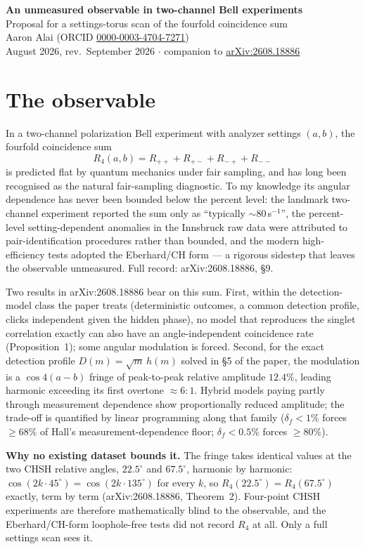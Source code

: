 \documentclass[11pt]{article}
\begin{document}
\begin{center}
{\Large\bfseries An unmeasured observable in two-channel Bell experiments}\\[3pt]
{\large Proposal for a settings-torus scan of the fourfold coincidence sum}\\[5pt]
Aaron Alai (ORCID \href{https://orcid.org/0000-0003-4704-7271}{0000-0003-4704-7271})\\
August 2026, rev.\ September 2026 $\cdot$ companion to \href{https://arxiv.org/abs/2608.18886}{arXiv:2608.18886}
\end{center}

\section*{The observable}
In a two-channel polarization Bell experiment with analyzer settings $(a,b)$, the fourfold coincidence sum
\[
R_4(a,b) = R_{++}+R_{+-}+R_{-+}+R_{--}
\]
is predicted flat by quantum mechanics under fair sampling, and has long been recognised as the natural fair-sampling diagnostic. To my knowledge its angular dependence has never been bounded below the percent level: the landmark two-channel experiment reported the sum only as ``typically $\sim$80\,s$^{-1}$'', the percent-level setting-dependent anomalies in the Innsbruck raw data were attributed to pair-identification procedures rather than bounded, and the modern high-efficiency tests adopted the Eberhard/CH form --- a rigorous sidestep that leaves the observable unmeasured. Full record: arXiv:2608.18886, \S9.

Two results in arXiv:2608.18886 bear on this sum. First, within the detection-model class the paper treats (deterministic outcomes, a common detection profile, clicks independent given the hidden phase), no model that reproduces the singlet correlation exactly can also have an angle-independent coincidence rate (Proposition~1); some angular modulation is forced. Second, for the exact detection profile $D(m)=\sqrt{m}\,h(m)$ solved in \S5 of the paper, the modulation is a $\cos 4(a-b)$ fringe of peak-to-peak relative amplitude $12.4\%$, leading harmonic exceeding its first overtone $\approx 6{:}1$. Hybrid models paying partly through measurement dependence show proportionally reduced amplitude; the trade-off is quantified by linear programming along that family ($\delta_f<1\%$ forces $\geq 68\%$ of Hall's measurement-dependence floor; $\delta_f<0.5\%$ forces $\geq 80\%$).

\textbf{Why no existing dataset bounds it.} The fringe takes identical values at the two CHSH relative angles, $22.5^\circ$ and $67.5^\circ$, harmonic by harmonic: $\cos(2k\cdot 45^\circ)=\cos(2k\cdot 135^\circ)$ for every $k$, so $R_4(22.5^\circ)=R_4(67.5^\circ)$ exactly, term by term (arXiv:2608.18886, Theorem~2). Four-point CHSH experiments are therefore mathematically blind to the observable, and the Eberhard/CH-form loophole-free tests did not record $R_4$ at all. Only a full settings scan sees it.
\end{document}
